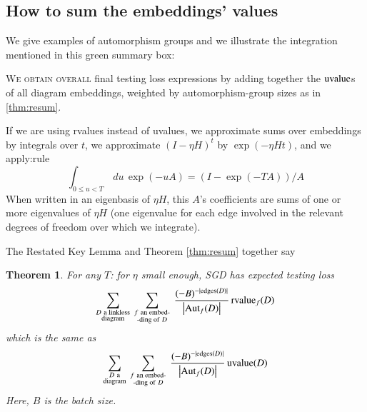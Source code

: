 \documentclass[anon,12pt]{colt2021} %
\newcommand{\translucent}[2]{\colorbox{#1}{#2}}
\newtheorem*{thm*}{Theorem}
\newcommand{\wabs}[1]{\left|#1\right|}
\newcommand{\Aut}{\text{\textnormal{Aut}}}
\newcommand{\uvalue}{\text{\textnormal{uvalue}}}
\newcommand{\rvalue}{\text{\textnormal{rvalue}}}
\newcommand{\edges}{\text{\textnormal{edges}}}
\begin{document}
{    \subsection{How to sum the embeddings' values}                  \label{appendix:sum-embeddings}

        We give examples of automorphism groups and we illustrate the
        integration mentioned in this green summary box:
        \par
        \noindent
        \translucent{moolime}{\parbox{\textwidth}{
            \textsc{We obtain overall} final testing loss expressions
            by adding together the $\uvalue$s of all diagram embeddings, weighted
            by automorphism-group sizes as in \ref{thm:resum}.
            \newline
            \par
            If we are using rvalues instead of uvalues, 
            we approximate sums over embeddings by
                integrals over $t$, we approximate $(I-\eta H)^t$ by $\exp(- \eta H t)$,
            and we apply:rule
                $$\int_{0\leq u<T} \, du \, \exp(-u A) = (I - \exp(-T A))/A$$ 
            When written in an eigenbasis of $\eta H$, this $A$'s coefficients are
            sums of one or more eigenvalues of $\eta H$ (one eigenvalue for each
            edge involved in the relevant degrees of freedom over which we
            integrate).  %
        }}

        The Restated Key Lemma and Theorem \ref{thm:resum} together say %
        \begin{thm*}
            For any $T$: for $\eta$ small enough, SGD has expected testing loss
            \begin{equation*}
                \sum_{\substack{D~\text{a linkless} \\ \text{diagram}}}
                ~
                \sum_{\substack{f~\text{an embed-} \\ \text{-ding of}~D}}
                ~
                \frac{(-B)^{-|\edges(D)|}}{\wabs{\Aut_f(D)}}
                \,
                {\rvalue_f}(D)
            \end{equation*}
            which is the same as
            \begin{equation*}
                \sum_{\substack{D~\text{a} \\ \text{diagram}}}
                ~
                \sum_{\substack{f~\text{an embed-} \\ \text{-ding of}~D}}
                ~
                \frac{(-B)^{-|\edges(D)|}}{\wabs{\Aut_f(D)}}
                \,
                {\uvalue}(D)
            \end{equation*}
            Here, $B$ is the batch size.
        \end{thm*}

}
\end{document}
